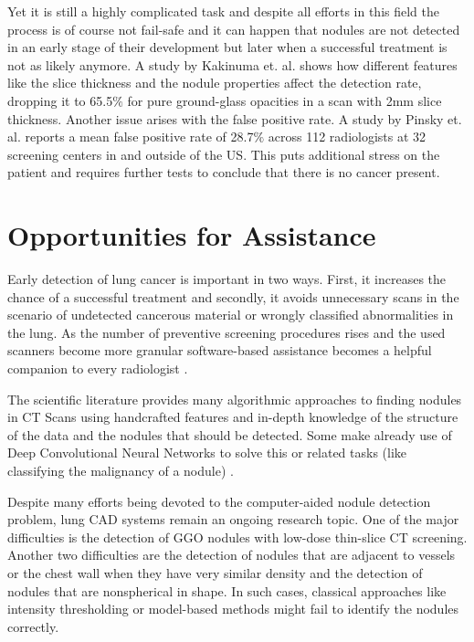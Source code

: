 \documentclass[main.tex]{subfiles}
\begin{document}
Yet it is still a highly complicated task and despite all efforts in this field the process is of course not fail-safe and it can happen that nodules are not detected in an early stage of their development but later when a successful treatment is not as likely anymore. A study by Kakinuma et. al.\cite{kakinuma2012comparison} shows how different features like the slice thickness and the nodule properties affect the detection rate, dropping it to 65.5$\%$ for pure ground-glass opacities in a scan with 2mm slice thickness. Another issue arises with the false positive rate. A study by Pinsky et. al.\cite{pinsky2013national} reports a mean false positive rate of 28.7$\%$ across 112 radiologists at 32 screening centers in and outside of the US. This puts additional stress on the patient and requires further tests to conclude that there is no cancer present.


\section{Opportunities for Assistance}

Early detection of lung cancer is important in two ways. First, it increases the chance of a successful treatment and secondly, it avoids unnecessary scans in the scenario of undetected cancerous material or wrongly classified abnormalities in the lung. As the number of preventive screening procedures rises and the used scanners become more granular software-based assistance becomes a helpful companion to every radiologist \cite{li2005computer}.

The scientific literature provides many algorithmic approaches to finding nodules in CT Scans \cite{armato1999computerized}\cite{armato2001automated}\cite{okada2005robust}\cite{tao2009multi}\cite{ye2009shape} using handcrafted features and in-depth knowledge of the structure of the data and the nodules that should be detected. Some make already use of Deep Convolutional Neural Networks to solve this or related tasks (like classifying the malignancy of a nodule) \cite{cheng2016computer}\cite{huang2017lung}\cite{shen2015multi}.

Despite many efforts being devoted to the computer-aided nodule detection problem, lung CAD systems remain an ongoing research topic. One of the major difficulties is the detection of GGO nodules with low-dose thin-slice CT screening. Another two difficulties are the detection of nodules that are adjacent to vessels or the chest wall when they have very similar density and the detection of nodules that are nonspherical in shape. In such cases, classical approaches like intensity thresholding or model-based methods might fail to identify the nodules correctly.
\end{document}

